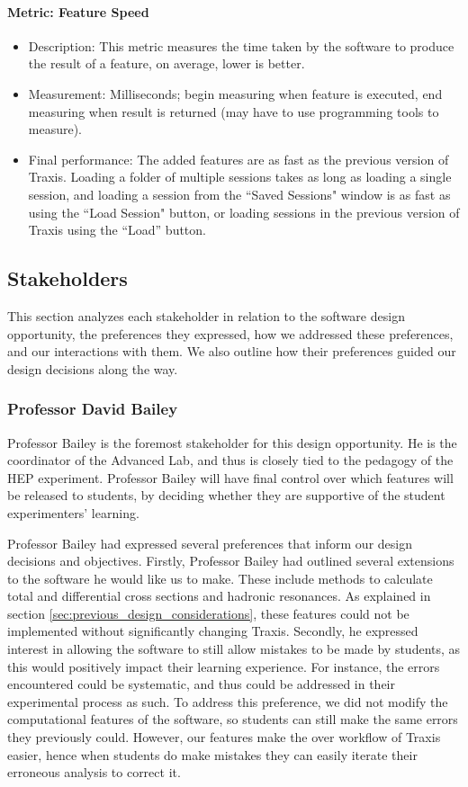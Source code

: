 \documentclass[12pt]{article} %
\begin{document}
\paragraph{Metric: Feature Speed}
\begin{itemize}
    \item Description: This metric measures the time taken by the software to produce the result of a feature, on average, lower is better.
    \item Measurement: Milliseconds; begin measuring when feature is executed, end measuring when result is returned (may have to use programming tools to measure).
    \item Final performance: The added features are as fast as the previous version of Traxis. Loading a folder of multiple sessions takes as long as loading a single session, and loading a session from the ``Saved Sessions" window is as fast as using the ``Load Session" button, or loading sessions in the previous version of Traxis using the ``Load'' button.
\end{itemize}

\subsection{Stakeholders}
This section analyzes each stakeholder in relation to the software design opportunity, the preferences they expressed, how we addressed these preferences, and our interactions with them. We also outline how their preferences guided our design decisions along the way.

\subsubsection{Professor David Bailey} \label{dbaileysoftware}
Professor Bailey is the foremost stakeholder for this design opportunity. He is the coordinator of the Advanced Lab, and thus is closely tied to the pedagogy of the HEP experiment. Professor Bailey will have final control over which features will be released to students, by deciding whether they are supportive of the student experimenters' learning.

Professor Bailey had expressed several preferences that inform our design decisions and objectives. Firstly, Professor Bailey had outlined several extensions to the software he would like us to make. These include methods to calculate total and differential cross sections and hadronic resonances. As explained in section \ref{sec:previous_design_considerations}, these features could not be implemented without significantly changing Traxis. Secondly, he expressed interest in allowing the software to still allow mistakes to be made by students, as this would positively impact their learning experience. For instance, the errors encountered could be systematic, and thus could be addressed in their experimental process as such. To address this preference, we did not modify the computational features of the software, so students can still make the same errors they previously could. However, our features make the over workflow of Traxis easier, hence when students do make mistakes they can easily iterate their erroneous analysis to correct it. 
\end{document}
